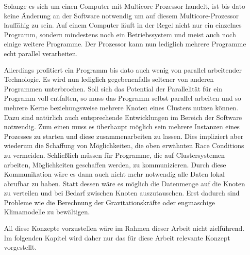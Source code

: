       Solange es sich um einen Computer mit Multicore-Prozessor handelt, ist bis dato keine Änderung an der Software notwendig um auf diesem Multicore-Prozessor lauffähig zu sein. 
      Auf einem Computer läuft in der Regel nicht nur ein einzelnes Programm, sondern mindestens noch ein Betriebssystem und meist auch noch einige weitere Programme.
      Der Prozessor kann nun lediglich mehrere Programme echt parallel verarbeiten.
      
      Allerdings profitiert ein Programm bis dato auch wenig von parallel arbeitender Technologie. Es wird nun lediglich gegebenenfalls seltener von anderen Programmen unterbrochen.
      Soll sich das Potential der Parallelität für ein Programm voll entfalten, so muss das Programm selbst parallel arbeiten und so mehrere Kerne beziehungsweise mehrere Knoten eines 
      Clusters nutzen können. Dazu sind natürlich auch entsprechende Entwicklungen im Bereich der Software notwendig. Zum einen muss es überhaupt möglich sein mehrere Instanzen eines 
      Prozesses zu starten und diese zusammenarbeiten zu lassen. Dies impliziert aber wiederum die Schaffung von Möglichkeiten, die oben erwähnten Race Conditions zu vermeiden. Schließlich 
      müssen für Programme, die auf Clustersystemen arbeiten, Möglichkeiten geschaffen werden, zu kommunizieren. Durch diese Kommunikation wäre es dann auch nicht mehr notwendig alle Daten
      lokal abrufbar zu haben. Statt dessen wäre es möglich die Datenmenge auf die Knoten zu verteilen und bei Bedarf zwischen Knoten auszutauschen. Erst dadurch sind Probleme wie die 
      Berechnung der Gravitationskräfte oder engmaschige Klimamodelle zu bewältigen.
      
      All diese Konzepte vorzustellen wäre im Rahmen dieser Arbeit nicht zielführend. Im folgenden Kapitel wird daher nur das für diese Arbeit relevante Konzept vorgestellt.
      
